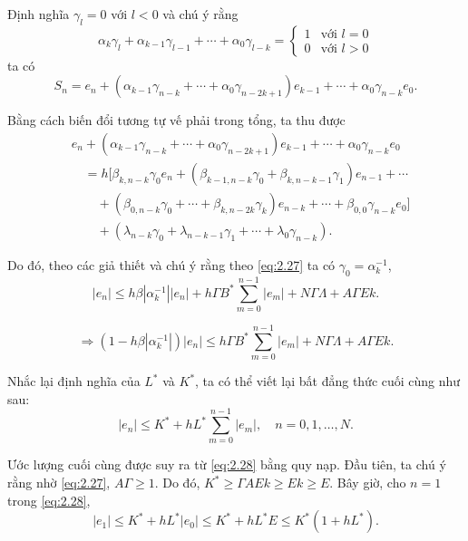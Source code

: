Định nghĩa $\gamma_l = 0$ với $l < 0$ và chú ý rằng
\begin{equation}
    \alpha_k \gamma_l + \alpha_{k-1} \gamma_{l-1} + \cdots + \alpha_0 \gamma_{l-k} = 
    \begin{cases} 
    1 & \text{với } l = 0 \\ 
    0 & \text{với } l > 0 
    \end{cases} \tag{2.27} \label{eq:2.27}
\end{equation}
ta có
\begin{equation*}
    S_n = e_n + (\alpha_{k-1} \gamma_{n-k} + \cdots + \alpha_0 \gamma_{n-2k+1})e_{k-1} + \cdots + \alpha_0 \gamma_{n-k} e_0 .
\end{equation*}

Bằng cách biến đổi tương tự vế phải trong tổng, ta thu được
\begin{align*}
&e_n + (\alpha_{k-1} \gamma_{n-k} + \cdots + \alpha_0 \gamma_{n-2k+1})e_{k-1} + \cdots + \alpha_0 \gamma_{n-k} e_0 \\
&\quad = h \big[ \beta_{k, n-k} \gamma_0 e_n + (\beta_{k-1, n-k} \gamma_0 + \beta_{k, n-k-1} \gamma_1)e_{n-1} + \cdots \\
&\quad\quad + (\beta_{0, n-k} \gamma_0 + \cdots + \beta_{k, n-2k} \gamma_k)e_{n-k} + \cdots + \beta_{0,0} \gamma_{n-k} e_0 \big] \\
&\quad\quad + (\lambda_{n-k} \gamma_0 + \lambda_{n-k-1} \gamma_1 + \cdots + \lambda_0 \gamma_{n-k}) .
\end{align*}

Do đó, theo các giả thiết và chú ý rằng theo \eqref{eq:2.27} ta có $\gamma_0 = \alpha_k^{-1}$,
\begin{equation*}
    |e_n| \le h\beta|\alpha_k^{-1}| |e_n| + h\Gamma B^* \sum_{m=0}^{n-1} |e_m| + N\Gamma\Lambda + A\Gamma E k .
\end{equation*}

\begin{equation*}
  \Rightarrow  (1 - h\beta|\alpha_k^{-1}|)|e_n| \le h\Gamma B^* \sum_{m=0}^{n-1} |e_m| + N\Gamma\Lambda + A\Gamma E k .
\end{equation*}

Nhắc lại định nghĩa của $L^*$ và $K^*$, ta có thể viết lại bất đẳng thức cuối cùng như sau:
\begin{equation}
    |e_n| \le K^* + h L^* \sum_{m=0}^{n-1} |e_m|, \quad n = 0, 1, \dots, N . \tag{2.28} \label{eq:2.28}
\end{equation}

Ước lượng cuối cùng được suy ra từ \eqref{eq:2.28} bằng quy nạp. Đầu tiên, ta chú ý rằng nhờ \eqref{eq:2.27}, $A\Gamma \ge 1$. Do đó, $K^* \ge \Gamma A E k \ge E k \ge E$. Bây giờ, cho $n = 1$ trong \eqref{eq:2.28},
\begin{equation*}
    |e_1| \le K^* + h L^* |e_0| \le K^* + h L^* E \le K^*(1 + h L^*) .
\end{equation*}

